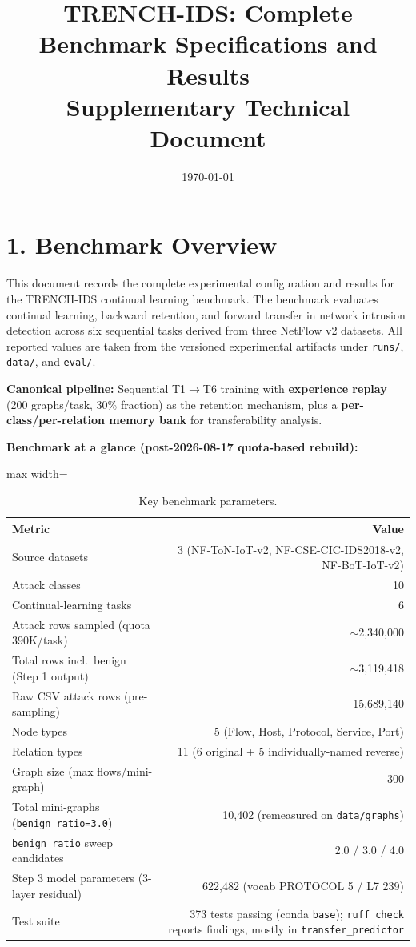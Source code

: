 \documentclass[11pt,a4paper]{article}
\title{TRENCH-IDS: Complete Benchmark Specifications and Results\\Supplementary Technical Document}
\author{}
\date{\today}
\begin{document}
\maketitle

\section*{1. Benchmark Overview}
This document records the complete experimental configuration and results for the TRENCH-IDS continual learning benchmark. The benchmark evaluates continual learning, backward retention, and forward transfer in network intrusion detection across six sequential tasks derived from three NetFlow v2 datasets. All reported values are taken from the versioned experimental artifacts under \texttt{runs/}, \texttt{data/}, and \texttt{eval/}.

\textbf{Canonical pipeline:} Sequential T1$\to$T6 training with \textbf{experience replay} (200 graphs/task, 30\% fraction) as the retention mechanism, plus a \textbf{per-class/per-relation memory bank} for transferability analysis.

\textbf{Benchmark at a glance (post-2026-08-17 quota-based rebuild):}
\begin{table}[H]
\centering
\caption{Key benchmark parameters.}
\label{tab:benchmark-overview}
\begin{adjustbox}{max width=\textwidth}
\begin{tabular}{lr}
\toprule
Metric & Value \\
\midrule
Source datasets & 3 (NF-ToN-IoT-v2, NF-CSE-CIC-IDS2018-v2, NF-BoT-IoT-v2) \\
Attack classes & 10 \\
Continual-learning tasks & 6 \\
Attack rows sampled (quota 390K/task) & $\sim$2,340,000 \\
Total rows incl.\ benign (Step 1 output) & $\sim$3,119,418 \\
Raw CSV attack rows (pre-sampling) & 15,689,140 \\
Node types & 5 (Flow, Host, Protocol, Service, Port) \\
Relation types & 11 (6 original + 5 individually-named reverse) \\
Graph size (max flows/mini-graph) & 300 \\
Total mini-graphs (\texttt{benign\_ratio=3.0}) & 10,402 (remeasured on \texttt{data/graphs}) \\
\texttt{benign\_ratio} sweep candidates & 2.0 / 3.0 / 4.0 \\
Step 3 model parameters (3-layer residual) & 622,482 (vocab PROTOCOL 5 / L7 239) \\
Test suite & 373 tests passing (conda \texttt{base}); \texttt{ruff check} reports findings, mostly in \texttt{transfer\_predictor} \\
\bottomrule
\end{tabular}
\end{adjustbox}
\end{table}
\end{document}
